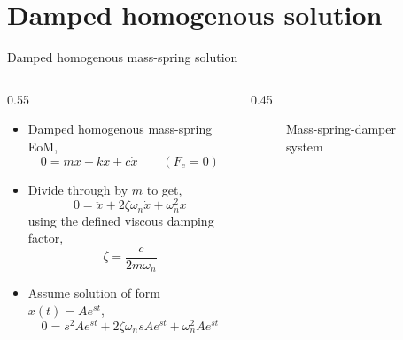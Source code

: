 \documentclass[11pt,aspectratio=169,handout]{beamer}
\begin{document}
\section{Damped homogenous solution}
\begin{frame}[c]{Damped homogenous mass-spring solution}
	\begin{columns}[T]
		\begin{column}{0.55\textwidth}
			\begin{itemize}
				\item<1-> Damped homogenous mass-spring EoM,
				\begin{equation}\label{}
					0 = m\ddot{x} + kx +c\dot{x} \quad \quad (F_e =0)
				\end{equation}
				\item<2-> Divide through by $m$ to get,
				\begin{equation}\label{}
					0 = \ddot{x} +2\zeta\omega_n \dot{x} + \omega_n^2 x 
				\end{equation}
				using the defined viscous damping factor,
				\begin{equation}
					\zeta = \frac{c}{2m\omega_n}
				\end{equation}
			\item<3-> Assume solution of form $x(t) = Ae^{st}$, 
				\begin{equation}\label{}
					0 = s^2 Ae^{st}  +2\zeta\omega_n s Ae^{st} + \omega_n^2 Ae^{st}
				\end{equation}
			\end{itemize}
		\end{column}
		\begin{column}{0.45\textwidth}
			\begin{figure}
				
				\caption{Mass-spring-damper system}
			\end{figure}
		\end{column}
	\end{columns}
\end{frame}
\end{document}
